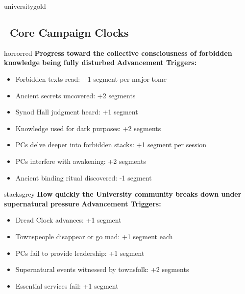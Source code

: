 \documentclass[11pt]{article}
\begin{document}
\newpage

\begin{campaignsection}{universitygold}
\subsection*{\faClock\ Core Campaign Clocks}

\begin{clockbox}{horrorred}
\textbf{Progress toward the collective consciousness of forbidden knowledge being fully disturbed}
\textbf{Advancement Triggers:}
\begin{itemize}
    \item Forbidden texts read: +1 segment per major tome
    \item Ancient secrets uncovered: +2 segments
    \item Synod Hall judgment heard: +1 segment
    \item Knowledge used for dark purposes: +2 segments
    \item PCs delve deeper into forbidden stacks: +1 segment per session
    \item PCs interfere with awakening: +2 segments
    \item Ancient binding ritual discovered: -1 segment
\end{itemize}
\end{clockbox}

\begin{clockbox}{stacksgrey}
\textbf{How quickly the University community breaks down under supernatural pressure}
\textbf{Advancement Triggers:}
\begin{itemize}
    \item Dread Clock advances: +1 segment
    \item Townspeople disappear or go mad: +1 segment each
    \item PCs fail to provide leadership: +1 segment
    \item Supernatural events witnessed by townsfolk: +2 segments
    \item Essential services fail: +1 segment
\end{itemize}
\end{clockbox}


\end{campaignsection}
\end{document}
